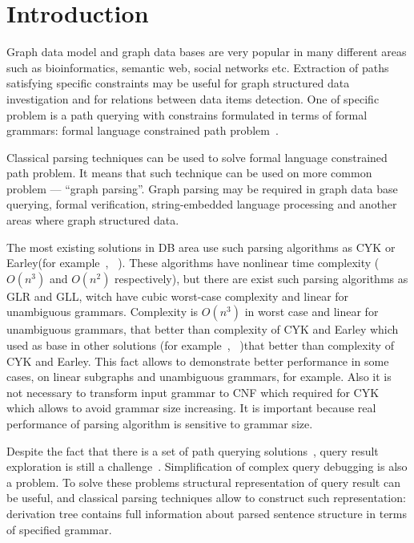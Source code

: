 \documentclass{sig-alternate} %
\begin{document}
\section{Introduction}
Graph data model and graph data bases are very popular in many different areas such as bioinformatics, semantic web, social networks etc.
Extraction of paths satisfying specific constraints may be useful for graph structured data investigation and for relations between data items detection.
One of specific problem is a path querying with constrains formulated in terms of formal grammars: formal language constrained path problem~\cite{FLCpathProblem}.


Classical parsing techniques can be used to solve formal language constrained path problem. 
It means that such technique can be used on more common problem --- ``graph parsing''. 
Graph parsing may be required in graph data base querying, formal verification, string-embedded language processing and another areas where graph structured data. 


The most existing solutions in DB area use such parsing algorithms as CYK or Earley(for example~\cite{ConjCFPathQuery}, ~\cite{GraphQueryWithEarley}). These algorithms have nonlinear time complexity ($O(n^3)$ and $O(n^2)$ respectively), but there are exist such parsing algorithms as GLR and GLL, witch have cubic worst-case complexity and linear for unambiguous grammars.  
Complexity is $O(n^3)$ in worst case and linear for unambiguous grammars, that better than complexity of CYK and Earley which used as base in other solutions (for example~\cite{ConjCFPathQuery}, ~\cite{GraphQueryWithEarley})that better than complexity of CYK and Earley.
This fact allows to demonstrate better performance in some cases, on linear subgraphs and unambiguous grammars, for example. 
Also it is not necessary to transform input grammar to CNF which required for CYK which allows to avoid grammar size increasing.
It is important because real performance of parsing algorithm is sensitive to grammar size.

Despite the fact that there is a set of path querying solutions~\cite{GraphQueryWithEarley, ConjCFPathQuery, !!!}, query result exploration is still a challenge~\cite{hofman2015separabilityForRegQueryDebugging}. 
Simplification of complex query debugging is also a problem.
To solve these problems structural representation of query result can be useful, and classical parsing techniques allow to construct such representation: derivation tree contains full information about parsed sentence structure in terms of specified grammar.
\end{document}
